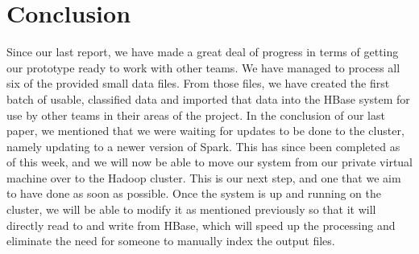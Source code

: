 \chapter{Conclusion}\label{ch:conclusion}

Since our last report, we have made a great deal of progress in terms of getting our prototype ready to work with other teams. We have managed to process all six of the provided small data files. From those files, we have created the first batch of usable, classified data and imported that data into the HBase system for use by other teams in their areas of the project. In the conclusion of our last paper, we mentioned that we were waiting for updates to be done to the cluster, namely updating to a newer version of Spark. This has since been completed as of this week, and we will now be able to move our system from our private virtual machine over to the Hadoop cluster. This is our next step, and one that we aim to have done as soon as possible. Once the system is up and running on the cluster, we will be able to modify it as mentioned previously so that it will directly read to and write from HBase, which will speed up the processing and eliminate the need for someone to manually index the output files.







